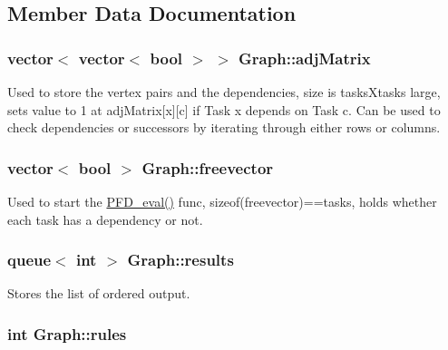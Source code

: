 \subsection{\-Member \-Data \-Documentation}
\hypertarget{structGraph_a25439b7cad72199504e1fdd1fbe70130}{
\subsubsection[{adj\-Matrix}]{\setlength{\rightskip}{0pt plus 5cm}vector$<$ vector$<$ bool $>$ $>$ {\bf \-Graph\-::adj\-Matrix}}}\label{structGraph_a25439b7cad72199504e1fdd1fbe70130}


\-Used to store the vertex pairs and the dependencies, size is tasks\-Xtasks large, sets value to 1 at adj\-Matrix\mbox{[}x\mbox{]}\mbox{[}c\mbox{]} if \-Task x depends on \-Task c. \-Can be used to check dependencies or successors by iterating through either rows or columns. 

\hypertarget{structGraph_a8d3788ddc13794edb1426c6c1960b4c6}{
\subsubsection[{freevector}]{\setlength{\rightskip}{0pt plus 5cm}vector$<$ bool $>$ {\bf \-Graph\-::freevector}}}\label{structGraph_a8d3788ddc13794edb1426c6c1960b4c6}


\-Used to start the \hyperlink{structGraph_ac6a0946ed59ad938626736c9c5e084e6}{\-P\-F\-D\-\_\-eval()} func, sizeof(freevector)==tasks, holds whether each task has a dependency or not. 

\hypertarget{structGraph_a97da3b3f97afbd334c70b354a3be4551}{
\subsubsection[{results}]{\setlength{\rightskip}{0pt plus 5cm}queue$<$ int $>$ {\bf \-Graph\-::results}}}\label{structGraph_a97da3b3f97afbd334c70b354a3be4551}


\-Stores the list of ordered output. 

\hypertarget{structGraph_a7d540d84c08510deb0f2b0692ed5afcd}{
\subsubsection[{rules}]{\setlength{\rightskip}{0pt plus 5cm}int {\bf \-Graph\-::rules}}}\label{structGraph_a7d540d84c08510deb0f2b0692ed5afcd}


